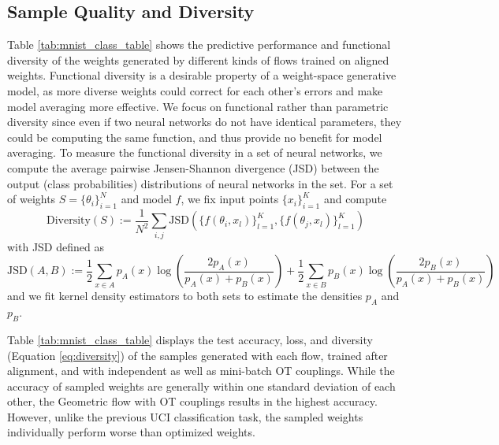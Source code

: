 \subsection{Sample Quality and Diversity} \label{sec:sample_quality_diversity}

Table \ref{tab:mnist_class_table} shows the predictive performance and functional diversity of the weights generated by different kinds of flows trained on aligned weights. Functional diversity is a desirable property of a weight-space generative model, as more diverse weights could correct for each other's errors and make model averaging more effective. We focus on functional rather than parametric diversity since even if two neural networks do not have identical parameters, they could be computing the same function, and thus provide no benefit for model averaging. To measure the functional diversity in a set of neural networks, we compute the average pairwise Jensen-Shannon divergence (JSD) \citep{endresNewMetricProbability2003,mishtalJensenShannonDivergenceEnsembles2012} between the output (class probabilities) distributions of neural networks in the set. For a set of weights $S = \{ \theta_i \}_{i=1}^N$ and model $f$, we fix input points $\{ x_i \}_{i=1}^K$ and compute
\begin{equation} \label{eq:diversity}
    \text{Diversity}(S) := \frac{1}{N^2} \sum_{i, j} \text{JSD}\left(
        \{ f(\theta_i, x_l)\}_{l=1}^K, 
        \{f(\theta_j, x_l)\}_{l=1}^K
    \right)
\end{equation}
with JSD defined as 
\begin{equation}
    \text{JSD}(A, B) := 
    \frac{1}{2} \sum_{x \in A} p_A(x) \log \left( \frac{2p_A(x)}{p_A(x) + p_B(x)} \right) + 
    \frac{1}{2} \sum_{x \in B} p_B(x) \log \left( \frac{2p_B(x)}{p_A(x) + p_B(x)} \right)
\end{equation}
and we fit kernel density estimators to both sets to estimate the densities $p_A$ and $p_B$. 

Table \ref{tab:mnist_class_table} displays the test accuracy, loss, and diversity (Equation \ref{eq:diversity}) of the samples generated with each flow, trained after alignment, and with independent as well as mini-batch OT couplings. While the accuracy of sampled weights are generally within one standard deviation of each other, the Geometric flow with OT couplings results in the highest accuracy. However, unlike the previous UCI classification task, the sampled weights individually perform worse than optimized weights. 


